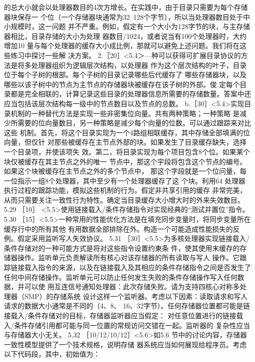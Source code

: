 的总大小就会以处理器数目的4次方增长。在实践中，由于目录只需要为每个存储器块保存一
个位（一个存储器块通常为32~128个字节），所以当处理器数目处于中小规模时，这一问题
并不严重。例如，假定有一个大小为128字节的块，与主存储器相比，目录存储的大小为处理
器数目/1024，或者说当有100个处理器时，大约增加10%
量与每个处理器的缓存大小成比例，那就可以避免上述问题。我们将在这些练习中探讨一些解
决方案。
2.［20］<5.4＞—种可以获得可扩展目录协议的方法是将多处理器组织为逻辑层次结构，以处理器
作为这个层次结构的叶子，目录位于每个子树的根部。每个子树的目录记录哪些后代缓存了
哪些存储器块，以及哪些以该子树中的节点为主节点的存储器块被缓存在该子树的外部。俊
定每个目录都是完全相联的，计算记录这些目录的处理器信息所需要的存储数量。答案中还
应当包括该层次结构每一级中的节点数目以及节点的总数。
b.［30］<5.4>实现目录机制的一种替代方法是实现一些非密集位向量。共有两种策略；一种策略
是减少所需要的位向量数目，另一种策略是减少每个向量的位数。可以通过跟踪来对比这些
机制。首先，将这个目录实现为一个4路组相联缓存，其中存储全部填满的位向量，但仅针
对那些被缓存在主节点外部的块。如果发生了目录缓存缺失，选择一个目录项，并使该项失
效。第二，将目录实现为每个项目包含8个位。如果某个块仅被缓存在其主节点之外的唯一
节点中，那这个宇段将包含这个节点的编号。如果这个块被缓存在主节点之外的多个节点中，
那这个字段就是一个位问量，每一位指示一组8个处理器，其中至少有一个处理器缓存了这
个块。利用64 处理器执行过程的跟踪功能，模拟这些机制的行为。假定非共享引用的缓存
非常完美，从而只需要关注一致性行为特性。确定当目录缓存大小增大时的外来失效数目。
5.29
［10］ <5.5>使用链接载入/条件存储指令对实现经典的“测试并置位”指令。
5.30
［15］<5.5>一种常用的性能优化方法是在填充同步变量时，将同步变量所在缓存行中的所有其他
有用数据全部排除在外。构造一个可能造成性能损失的反例。假定采用监听写人失效协议。
5.31
［30］<5.5>为多核处理器实现链接载入/条件存储对的一种可能方式是将对这些指令设置约東条
件，使其使用末缓存的存储器操作。监听单元负责解读所有核心对该存储器的所有读取与写人
操作。它跟踪链接载入指令的来源，以及在链接载入及其相应的条件存储指令之间是否发生了
任何中间存储操作。监听单元可以防止任何发生失败的条件存储操作写入任何数据，并可以使
用互连信号通知处理器：此次存储失败。请为支持四核心对称多处理器（SMP）的存储系统
设计这样一个监听器。考虑以下因素：读取请求和写人请求的数据大小通常是不同的（4、8、
16、32字节）。任何存储器位置都可能是链接载入/条件存储对的目标，存储器监听器应当假定：
对任意位置进行的链接载入/条件存储引用都可能与同一位置的常规访问交错在一起。监听器的
复杂性应当与存储器大小无关。
5.32 ［10/12/10/12］<5.6>如5.6 节中的讨论内容，存储器一致性模型提供了一个技术规格，说明存储
器系统应当如何展现给程序员。考虑以下代码段，其中，初始值为：

